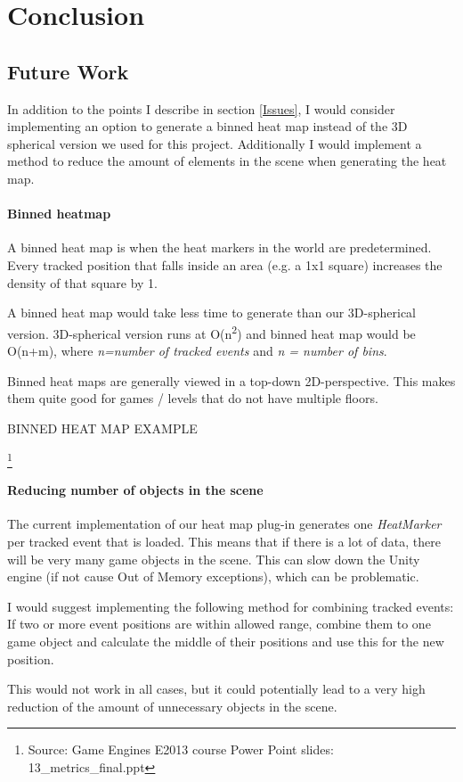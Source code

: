 \section{Conclusion}

\subsection{Future Work}
In addition to the points I describe in section \ref{Issues}, I would consider implementing an option to generate a binned heat map instead of the 3D spherical version we used for this project.  Additionally I would implement a method to reduce the amount of elements in the scene when generating the heat map.
\paragraph{Binned heatmap}
A binned heat map is when the heat markers in the world are predetermined. Every tracked position that falls inside an area (e.g. a 1x1 square) increases the density of that square by 1. 

A binned heat map would take less time to generate than our 3D-spherical version. 3D-spherical version runs at O(n\textsuperscript{2}) and binned heat map would be O(n+m), where \textit{n=number of tracked events} and \textit{n = number of bins}. 

Binned heat maps are generally viewed in a top-down 2D-perspective. This makes them quite good for games / levels that do not have multiple floors.

BINNED HEAT MAP EXAMPLE

\footnote{Source: Game Engines E2013 course Power Point slides: 13\_metrics\_final.ppt}
\paragraph{Reducing number of objects in the scene}
The current implementation of our heat map plug-in generates one \textit{HeatMarker} per tracked event that is loaded. This means that if there is a lot of data, there will be very many game objects in the scene. This can slow down the Unity engine (if not cause Out of Memory exceptions), which can be problematic. 

I would suggest implementing  the following method for combining tracked events: If two or more event positions are within allowed range, combine them to one game object and calculate the middle of their positions and use this for the new position.

This would not work in all cases, but it could potentially lead to a very high reduction of the amount of unnecessary objects in the scene.
